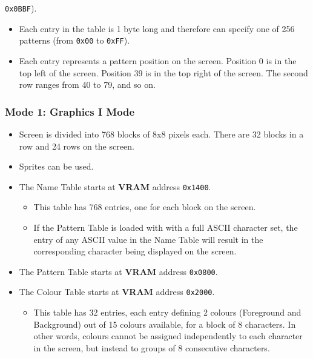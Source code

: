 \documentclass[a4paper,11pt]{article}
\begin{document}
\begin{itemize}
                \texttt{0x0BBF}).
            \begin{itemize}
                \item Each entry in the table is 1 byte long and therefore can
                    specify one of 256 patterns (from \texttt{0x00} to
                    \texttt{0xFF}).
                \item Each entry represents a pattern position on the screen.
                    Position 0 is in the top left of the screen. Position 39 is
                    in the top right of the screen. The second row ranges from
                    40 to 79, and so on.
            \end{itemize}
        \end{itemize}

        \subsubsection{Mode 1: \textbf{Graphics I Mode}}
        \begin{itemize}
            \item Screen is divided into 768 blocks of 8x8 pixels each. There
                are 32 blocks in a row and 24 rows on the screen.
            \item Sprites can be used.
            \item The Name Table starts at \textbf{VRAM} address \texttt{0x1400}.
            \begin{itemize}
                \item This table has 768 entries, one for each block on the screen.
                \item If the Pattern Table is loaded with with a full ASCII
                    character set, the entry of any ASCII value in the Name
                    Table will result in the corresponding character being
                    displayed on the screen.
            \end{itemize}
            \item The Pattern Table starts at \textbf{VRAM} address \texttt{0x0800}.
            \item The Colour Table starts at \textbf{VRAM} address \texttt{0x2000}.
            \begin{itemize}
                \item This table has 32 entries, each entry defining 2 colours
                (Foreground and Background) out of 15 colours available, for a
                block of 8 characters. In other words, colours cannot be
                assigned independently to each character in the screen, but
                instead to groups of 8 consecutive characters.
            \end{itemize}
        \end{itemize}
\end{document}
